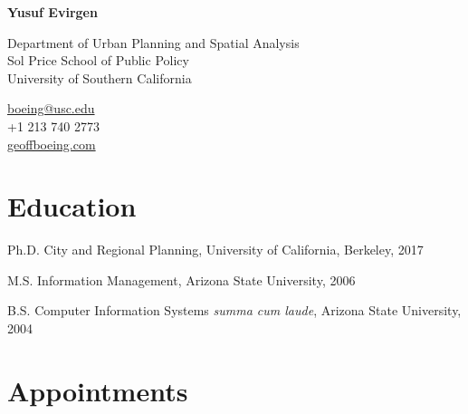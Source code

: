 \documentclass[11pt,letterpaper]{report}
\newcommand{\myname}{Yusuf Evirgen}
\newcommand{\namefont}[1]{{\normalfont\bfseries\Huge{#1}}}
\begin{document}
    \raggedright{}

    \namefont{\myname}

    \vspace{1em}
    \begin{minipage}[t]{0.700\textwidth}
        Department of Urban Planning and Spatial Analysis \\
        Sol Price School of Public Policy \\
        University of Southern California
    \end{minipage}
    \begin{minipage}[t]{0.295\textwidth}
        \flushright{}
        \href{mailto:boeing@usc.edu}{boeing@usc.edu} \\
        +1 213 740 2773 \\
        \href{https://geoffboeing.com}{geoffboeing.com}
    \end{minipage}


    \section*{Education}

    \begin{tablist}

        \item[Ph.D.] \tab{}City and Regional Planning, University of California, Berkeley, 2017
        \item[M.S.]  \tab{}Information Management, Arizona State University, 2006
        \item[B.S.]  \tab{}Computer Information Systems \textit{summa cum laude}, Arizona State University, 2004

    \end{tablist}



    \section*{Appointments}
\end{document}
